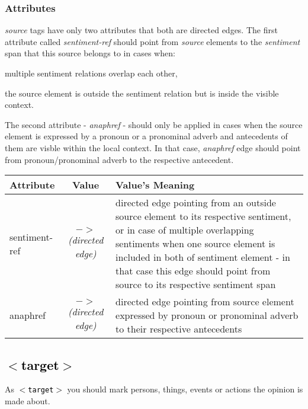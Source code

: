 \documentclass[11pt,a4paper]{article}
\newcommand{\xmltag}[1]{\textcolor{black}{{\small$<$#1$>$}}}
\begin{document}
\subsubsection{Attributes}\label{src-attrs}
\textit{source} tags have only two attributes that both are directed
edges. The first attribute called \textit{sentiment-ref} should point
from \textit{source} elements to the \textit{sentiment} span that this
source belongs to in cases when:
\begin{inparaenum}
\item multiple sentiment relations overlap each other,
\item the source element is outside the sentiment relation but is inside the visible context.
\end{inparaenum}
The second attribute - \textit{anaphref} - should only be applied in
cases when the source element is expressed by a pronoun or a pronominal adverb
and antecedents of them are visble within the local context. In that
case, \textit{anaphref} edge should point from pronoun/pronominal
adverb to the respective antecedent.

\begin{tabular}{|l|c|p{}|}\hline
  Attribute & Value & Value's Meaning\\\hline

  sentiment-ref & \textit{$->$\newline(directed edge)} & directed edge
  pointing from an outside source element to its respective sentiment,
  or in case of multiple overlapping sentiments when one source
  element is included in both of sentiment element - in that case this
  edge should point from source to its respective sentiment span\\\hline

  anaphref & \textit{$->$\newline(directed edge)} & directed edge
  pointing from source element expressed by pronoun or pronominal
  adverb to their respective antecedents\\\hline
\end{tabular}


\subsection{\xmltag{target}}
As \texttt{\xmltag{target}} you should mark persons, things,
events or actions the opinion is made about.
\end{document}

